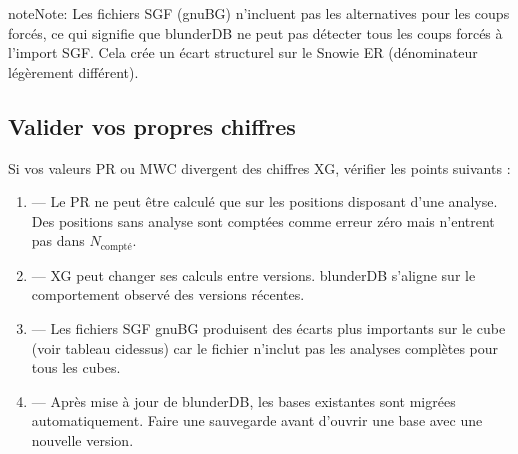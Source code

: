 \documentclass[letterpaper,10pt,french]{sphinxmanual}
\begin{document}
\begin{sphinxadmonition}{note}{Note:}
\sphinxAtStartPar
Les fichiers SGF (gnuBG) n’incluent pas les alternatives pour les coups
forcés, ce qui signifie que blunderDB ne peut pas détecter tous les coups
forcés à l’import SGF. Cela crée un écart structurel sur le Snowie ER
(dénominateur légèrement différent).
\end{sphinxadmonition}


\subsection{Valider vos propres chiffres}
\label{\detokenize{stats_parity:valider-vos-propres-chiffres}}
\sphinxAtStartPar
Si vos valeurs PR ou MWC divergent des chiffres XG, vérifier les points
suivants :
\begin{enumerate}
%
\item {} 
\sphinxAtStartPar
{} — Le PR ne peut être calculé que sur les positions
disposant d’une analyse. Des positions sans analyse sont comptées comme
erreur zéro mais n’entrent pas dans \(N_\text{compté}\).

\item {} 
\sphinxAtStartPar
{} — XG peut changer ses calculs entre versions. blunderDB
s’aligne sur le comportement observé des versions récentes.

\item {} 
\sphinxAtStartPar
{} — Les fichiers SGF gnuBG produisent des écarts plus
importants sur le cube (voir tableau ci\sphinxhyphen{}dessus) car le fichier n’inclut
pas les analyses complètes pour tous les cubes.

\item {} 
\sphinxAtStartPar
{} — Après mise à jour de blunderDB, les bases existantes
sont migrées automatiquement. Faire une sauvegarde avant d’ouvrir une base
avec une nouvelle version.

\end{enumerate}
\end{document}
